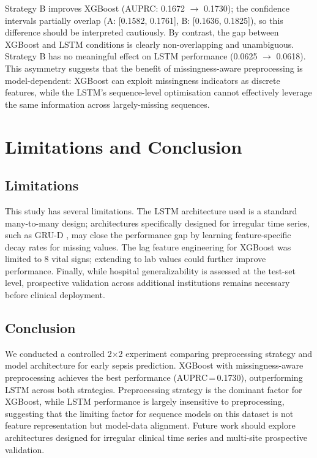 \documentclass[conference]{IEEEtran}
\begin{document}
Strategy B improves XGBoost (AUPRC: 0.1672 $\to$ 0.1730); the confidence intervals
partially overlap (A: [0.1582, 0.1761], B: [0.1636, 0.1825]), so this difference
should be interpreted cautiously. By contrast, the gap between XGBoost and LSTM
conditions is clearly non-overlapping and unambiguous. Strategy B has no meaningful
effect on LSTM performance (0.0625 $\to$ 0.0618). This asymmetry suggests that the
benefit of missingness-aware preprocessing is model-dependent: XGBoost can exploit
missingness indicators as discrete features, while the LSTM's sequence-level
optimisation cannot effectively leverage the same information across largely-missing
sequences.

\section{Limitations and Conclusion}

\subsection{Limitations}

This study has several limitations. The LSTM architecture used is a standard
many-to-many design; architectures specifically designed for irregular time series,
such as GRU-D \cite{che2018recurrent}, may close the performance gap by learning
feature-specific decay rates for missing values. The lag feature engineering for
XGBoost was limited to 8 vital signs; extending to lab values could further improve
performance. Finally, while hospital generalizability is assessed at the test-set
level, prospective validation across additional institutions remains necessary before
clinical deployment.

\subsection{Conclusion}

We conducted a controlled 2$\times$2 experiment comparing preprocessing strategy and
model architecture for early sepsis prediction. XGBoost with missingness-aware
preprocessing achieves the best performance (AUPRC\,=\,0.1730), outperforming
LSTM across both strategies. Preprocessing strategy is the dominant factor for
XGBoost, while LSTM performance is largely insensitive to preprocessing, suggesting
that the limiting factor for sequence models on this dataset is not feature
representation but model-data alignment. Future work should explore architectures
designed for irregular clinical time series and multi-site prospective validation.



\end{document}
